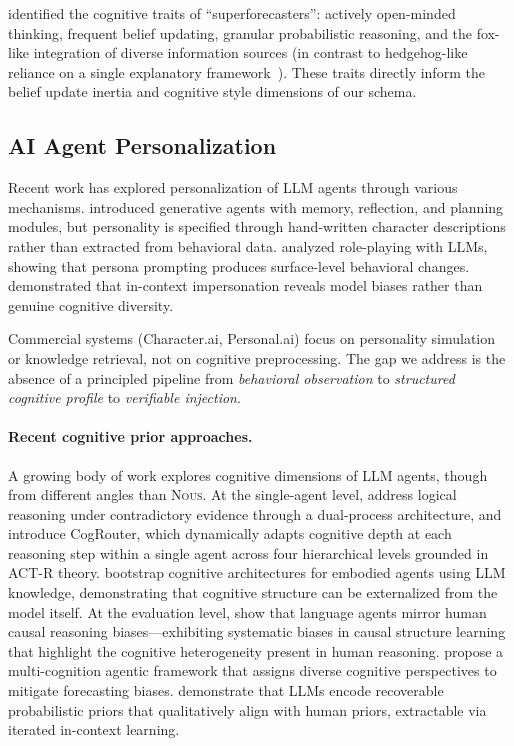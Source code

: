 \documentclass[11pt]{article}
\newcommand{\nous}{\textsc{Nous}}
\begin{document}
\citet{tetlock2015superforecasting} identified the cognitive traits of ``superforecasters'': actively open-minded thinking, frequent belief updating, granular probabilistic reasoning, and the fox-like integration of diverse information sources (in contrast to hedgehog-like reliance on a single explanatory framework~\citep{tetlock2005expert}). These traits directly inform the belief update inertia and cognitive style dimensions of our schema.

\subsection{AI Agent Personalization}

Recent work has explored personalization of LLM agents through various mechanisms. \citet{park2023generative} introduced generative agents with memory, reflection, and planning modules, but personality is specified through hand-written character descriptions rather than extracted from behavioral data. \citet{shanahan2023role} analyzed role-playing with LLMs, showing that persona prompting produces surface-level behavioral changes. \citet{salewski2024context} demonstrated that in-context impersonation reveals model biases rather than genuine cognitive diversity.

Commercial systems (Character.ai, Personal.ai) focus on personality simulation or knowledge retrieval, not on cognitive preprocessing. The gap we address is the absence of a principled pipeline from \emph{behavioral observation} to \emph{structured cognitive profile} to \emph{verifiable injection}.

\paragraph{Recent cognitive prior approaches.}
A growing body of work explores cognitive dimensions of LLM agents, though from different angles than \nous{}. At the single-agent level, \citet{bao2025conflictaware} address logical reasoning under contradictory evidence through a dual-process architecture, and \citet{yang2026thinkfastslow} introduce CogRouter, which dynamically adapts cognitive depth at each reasoning step within a single agent across four hierarchical levels grounded in ACT-R theory. \citet{zhu2024bootstrapping} bootstrap cognitive architectures for embodied agents using LLM knowledge, demonstrating that cognitive structure can be externalized from the model itself. At the evaluation level, \citet{chen2025causal} show that language agents mirror human causal reasoning biases---exhibiting systematic biases in causal structure learning that highlight the cognitive heterogeneity present in human reasoning. \citet{wang2025beyondbias} propose a multi-cognition agentic framework that assigns diverse cognitive perspectives to mitigate forecasting biases. \citet{zhu2024eliciting} demonstrate that LLMs encode recoverable probabilistic priors that qualitatively align with human priors, extractable via iterated in-context learning.
\end{document}
